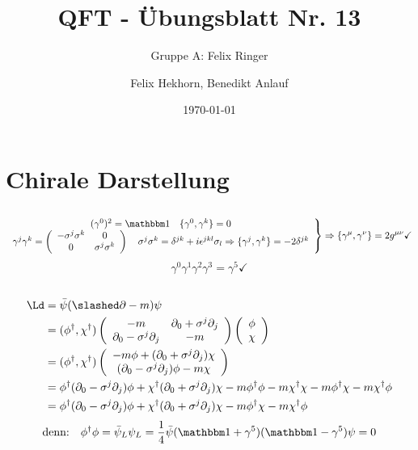 \documentclass[
  ngerman,		%
  a4paper,		%
  11pt,			%
  DIV=12,		%
  parskip=half  	%
]{scrartcl}
\title{QFT - Übungsblatt Nr. 13}
\author{Felix Hekhorn, Benedikt Anlauf}
\subtitle{ Gruppe A: Felix Ringer }
\date{\today}
\begin{document}
\maketitle

\setcounter{section}{38}
\def\thesubsection {\thesection.\alph{subsection}}

\section{Chirale Darstellung}
\subsection{}
\[
\left.\begin{array}{c}
(\gamma^0)^2 = \mathbbm 1 \quad \{\gamma^0,\gamma^k\} = 0 \\
\gamma^j\gamma^k =
\left(\begin{array}{cc}
-\sigma^j\sigma^k & 0\\
0 & \sigma^j\sigma^k
\end{array}\right) \quad \sigma^j\sigma^k = \delta^{jk} + i\epsilon^{jkl}\sigma_l \Rightarrow \{\gamma^j,\gamma^k\} = -2\delta^{jk}
\end{array}\right\} \Rightarrow \{\gamma^\mu,\gamma^\nu\}=2g^{\mu\nu} \checkmark
 \]
\[ \gamma^0\gamma^1\gamma^2\gamma^3 = \gamma^5 \checkmark \]
\subsection{}
\begin{align*}
\Ld &= \bar\psi(\slashed \partial - m)\psi\\
 &=
(\phi^\dag, \chi^\dag)
\left(\begin{array}{cc}
-m &\partial_0 + \sigma^j\partial_j\\
\partial_0 - \sigma^j\partial_j & -m
\end{array}\right)
\left(\begin{array}{c}\phi\\\chi\end{array}\right) \\
 &=
(\phi^\dag, \chi^\dag)
\left(\begin{array}{c}
-m\phi + (\partial_0 + \sigma^j\partial_j)\chi\\
(\partial_0 - \sigma^j\partial_j)\phi - m\chi
\end{array}\right) \\
 &= \phi^\dag(\partial_0 - \sigma^j\partial_j)\phi +  \chi^\dag(\partial_0 + \sigma^j\partial_j)\chi -m\phi^\dag\phi -m\chi^\dag\chi - m\phi^\dag\chi - m\chi^\dag\phi\\
&= \phi^\dag(\partial_0 - \sigma^j\partial_j)\phi +  \chi^\dag(\partial_0 + \sigma^j\partial_j)\chi - m\phi^\dag\chi - m\chi^\dag\phi
\end{align*}
\[\text{denn:}\quad \phi^\dag\phi = \bar\psi_L\psi_L = \frac 1 4\bar\psi(\mathbbm 1 + \gamma^5)(\mathbbm 1 - \gamma^5)\psi = 0\]
\end{document}
